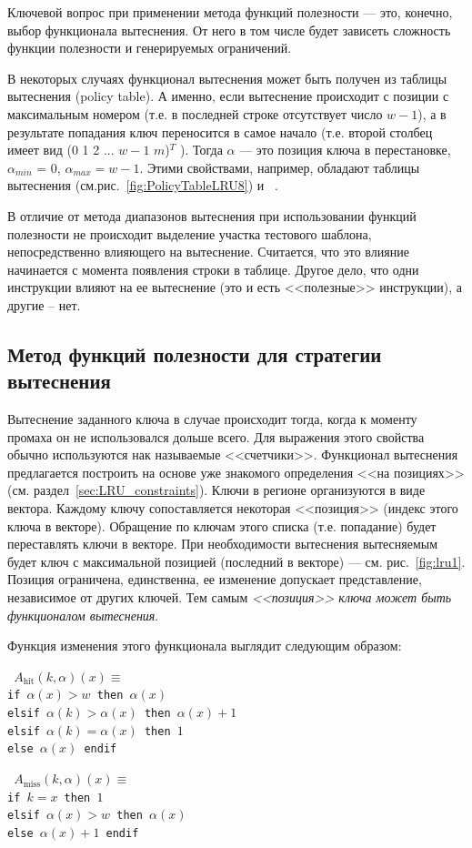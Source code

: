 Ключевой вопрос при применении метода функций полезности --- это, конечно, выбор
функционала вытеснения. От него в том числе будет зависеть сложность функции
полезности и генерируемых ограничений.

В некоторых случаях функционал вытеснения может быть получен из таблицы вытеснения
(policy table). А именно, если вытеснение происходит с позиции с максимальным
номером (т.е. в последней строке отсутствует число $w{-}1$), а в результате
попадания ключ переносится в самое начало (т.е. второй столбец имеет вид (0 1 2
... $w{-}1$ $m$)$^T$ ). Тогда $\alpha$ --- это позиция ключа в перестановке,
$\alpha_{min}$ = 0, $\alpha_{max} = w{-}1$. Этими свойствами, например, обладают
таблицы вытеснения \LRU (см.рис.~\ref{fig:PolicyTableLRU8}) и
\PseudoLRU~\cite{policy_tables}.

В отличие от метода диапазонов вытеснения при использовании функций полезности
не происходит выделение участка тестового шаблона, непосредственно влияющего на
вытеснение. Считается, что это влияние начинается с момента появления строки в
таблице. Другое дело, что одни инструкции влияют на ее вытеснение (это и есть
<<полезные>> инструкции), а другие -- нет.


\subsection{Метод функций полезности для стратегии вытеснения \LRU}

Вытеснение заданного ключа в случае \LRU происходит тогда, когда к моменту
промаха он не использовался дольше всего. Для выражения этого свойства обычно используются нак называемые <<счетчики>>. Функционал вытеснения предлагается построить на основе уже знакомого определения <<на позициях>> (см. раздел~\ref{sec:LRU_constraints}). Ключи в регионе организуются в виде вектора. Каждому ключу сопоставляется некоторая <<позиция>> (индекс этого ключа в
векторе). Обращение по ключам этого списка (т.е. попадание) будет переставлять
ключи в векторе. При необходимости вытеснения вытесняемым будет ключ с
максимальной позицией (последний в векторе) --- см. рис.~\ref{fig:lru1}. Позиция
ограничена, единственна, ее изменение допускает представление, независимое от
других ключей. Тем самым \emph{<<позиция>> ключа может быть функционалом вытеснения}.

Функция изменения этого функционала выглядит следующим образом:\\

\parbox{0.5\textwidth}{ \tt
$A_{\mbox{hit}}(k, \alpha)(x) \equiv$\\
if $\alpha(x) > w$ then $\alpha(x)$\\
elsif $\alpha(k) > \alpha(x)$ then $\alpha(x)+1$\\
elsif $\alpha(k) = \alpha(x)$ then $1$\\
else $\alpha(x)$ endif%
}\parbox{0.5\textwidth}{\tt
$A_{\mbox{miss}}(k, \alpha)(x) \equiv$\\
if $k = x$ then $1$\\
elsif $\alpha(x) > w$ then $\alpha(x)$\\
else $\alpha(x) + 1$ endif}\\

